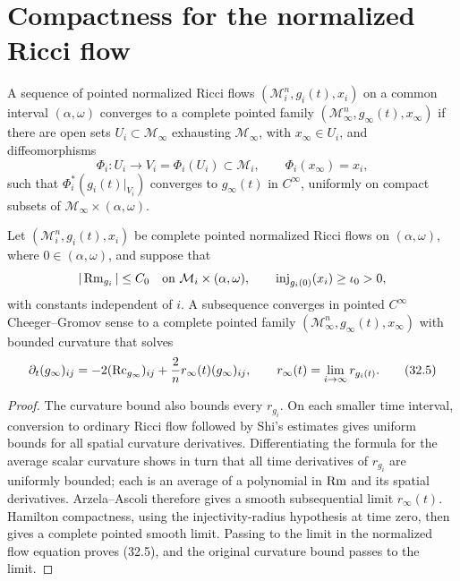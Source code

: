 \section{Compactness for the normalized Ricci flow}

\begin{definition}
\label{def:chow-iv-pointed-cheeger-gromov-convergence-nrf}
A sequence of pointed normalized Ricci flows
$(\mathcal M_i^n,g_i(t),x_i)$ on a common interval $(\alpha,\omega)$
converges to a complete pointed family
$(\mathcal M_\infty^n,g_\infty(t),x_\infty)$ if there are open sets
$U_i\subset\mathcal M_\infty$ exhausting $\mathcal M_\infty$, with
$x_\infty\in U_i$, and diffeomorphisms
\[
 \Phi_i:U_i\longrightarrow V_i=\Phi_i(U_i)\subset\mathcal M_i,
 \qquad \Phi_i(x_\infty)=x_i,
\]
such that $\Phi_i^*(g_i(t)|_{V_i})$ converges to $g_\infty(t)$ in
$C^\infty$, uniformly on compact subsets of
$\mathcal M_\infty\times(\alpha,\omega)$.
\end{definition}

\begin{theorem}
\label{thm:chow-iv-hamilton-compactness-nrf}
Let $(\mathcal M_i^n,g_i(t),x_i)$ be complete pointed normalized Ricci
flows on $(\alpha,\omega)$, where $0\in(\alpha,\omega)$, and suppose that
\[
 |\Rm_{g_i}|\le C_0
 \quad\text{on }\mathcal M_i\times(\alpha,\omega),
 \qquad
 \inj_{g_i(0)}(x_i)\ge\iota_0>0,
\]
with constants independent of $i$.  A subsequence converges in pointed
$C^\infty$ Cheeger--Gromov sense to a complete pointed family
$(\mathcal M_\infty^n,g_\infty(t),x_\infty)$ with bounded curvature that
solves
\begin{equation*}
 \partial_t(g_\infty)_{ij}
 =-2(\operatorname{Rc}_{g_\infty})_{ij}+\frac2n r_\infty(t)(g_\infty)_{ij},
 \qquad
 r_\infty(t)=\lim_{i\to\infty}r_{g_i(t)}.
 \tag{32.5}
\end{equation*}
\end{theorem}
\begin{proof}
The curvature bound also bounds every $r_{g_i}$.  On each smaller time
interval, conversion to ordinary Ricci flow followed by Shi's estimates
gives uniform bounds for all spatial curvature derivatives.  Differentiating
the formula for the average scalar curvature shows in turn that all time
derivatives of $r_{g_i}$ are uniformly bounded; each is an average of a
polynomial in $\operatorname{Rm}$ and its spatial derivatives.  Arzela--Ascoli therefore
gives a smooth subsequential limit $r_\infty(t)$.  Hamilton compactness,
using the injectivity-radius hypothesis at time zero, then gives a complete
pointed smooth limit.  Passing to the limit in the normalized flow equation
proves (32.5), and the original curvature bound passes to the limit.
\end{proof}

